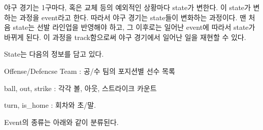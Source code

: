 \documentclass[twoside]{article}
\begin{document}
야구 경기는 1구마다, 혹은 교체 등의 예외적인 상황마다 state가 변한다. 이 state가 변하는 과정을 event라고 한다. 따라서 야구 경기는 state들이 변화하는 과정이다. 맨 처음 state는 선발 라인업을 반영해야 하고, 그 이후로는 일어난 event에 따라서 state가 바뀌게 된다. 이 과정을 track함으로써 야구 경기에서 일어난 일을 재현할 수 있다.

State는 다음의 정보를 담고 있다. 
\begin{compactitem}
\item Offense/Defencse Team : 공/수 팀의 포지션별 선수 목록
\item ball, out, strike : 각각 볼, 아웃, 스트라이크 카운트
\item turn, is\_home : 회차와 초/말. 
\end{compactitem}

Event의 종류는 아래와 같이 분류된다. 
\end{document}
